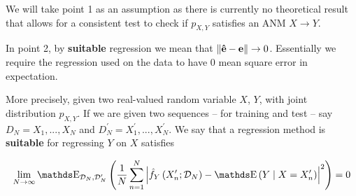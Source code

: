 We will take point 1 as an assumption as there is currently no theoretical result that allows for a consistent 
test to check if $p_{X, Y}$ satisfies an ANM $X \rightarrow Y$. 

In point 2, by \textbf{suitable} regression we mean that $\left\lVert\mathbf{\hat{e}} - \mathbf{e}\right\rVert \rightarrow 0$.
Essentially we require the regression used on the data to have 0 mean square error in expectation.

More precisely, given two real-valued random variable $X$, $Y$, with joint distribution $p_{X, Y}$. If 
we are given two sequences -- for training and test -- say $D_N = X_1, ..., X_N$ and 
$D_N^\prime = X^\prime_1, ..., X^\prime_N$. We say that a regression method is \textbf{suitable} for 
regressing $Y$ on $X$ satisfies

$$
\lim _{N \rightarrow \infty} \E_{\mathcal{D}_{N}, \mathcal{D}_{N}^{\prime}}\left(\frac{1}{N} 
\sum_{n=1}^{N}\left|\hat{f}_{Y}\left(X_{n}^{\prime} ; 
\mathcal{D}_{N}\right)-\E\left(Y \mid X=X_{n}^{\prime}\right)\right|^{2}\right)=0
$$



